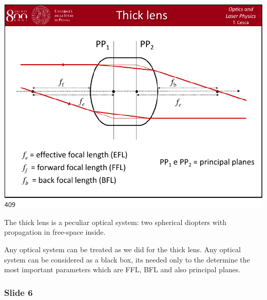 \documentclass[../main/main.tex]{subfiles}
\begin{document}
\begin{minipage}[]{0.5\linewidth}
\centering
\includegraphics[page=5,width=1\textwidth]{../lessons/pdf_file/20_lecture.pdf}
\end{minipage}
\hspace{0.3cm}\vspace{0.3cm}
\begin{minipage}[c]{0.47\linewidth}

The thick lens is a peculiar optical system: two spherical diopters with propagation in free-space inside.

Any optical system can be treated as we did for the thick lens. Any optical system can be considered as a black box, its needed only to the determine the most important parameters which are FFL, BFL and also principal planes.

\end{minipage}

\subsubsection*{Slide 6}
\end{document}
